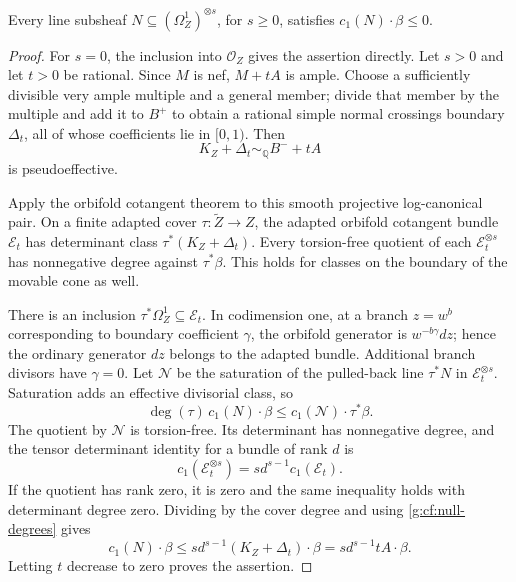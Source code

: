 \begin{lemma}\label{g:cf:cotangent-slope}
Every line subsheaf $N\subseteq(\Omega_Z^1)^{\otimes s}$, for
$s\geq0$, satisfies $c_1(N)\cdot\beta\leq0$.
\end{lemma}

\begin{proof}
For $s=0$, the inclusion into $\mathcal O_Z$ gives the
assertion directly.  Let $s>0$ and let $t>0$ be rational.
Since $M$ is nef, $M+tA$ is ample.  Choose a sufficiently
divisible very ample multiple and a general member; divide
that member by the multiple and add it to $B^+$ to obtain a
rational simple normal crossings boundary $\Delta_t$, all
of whose coefficients lie in $[0,1)$.  Then
\[
 K_Z+\Delta_t\sim_{\mathbb Q}B^-+tA
\]
is pseudoeffective.

Apply the orbifold cotangent theorem
\cite[Theorem~1.3 and Section~5]{CampanaPaun2019} to this smooth
projective log-canonical pair.  On a finite adapted cover
$\tau:\widetilde Z\to Z$, the adapted orbifold cotangent
bundle $\mathcal E_t$ has determinant class
$\tau^*(K_Z+\Delta_t)$.  Every torsion-free quotient of each
$\mathcal E_t^{\otimes s}$ has nonnegative degree against
$\tau^*\beta$.  This holds for classes on the boundary of
the movable cone as well.

There is an inclusion $\tau^*\Omega_Z^1\subseteq\mathcal E_t$.
In codimension one, at a branch $z=w^b$ corresponding to
boundary coefficient $\gamma$, the orbifold generator is
$w^{-b\gamma}dz$; hence the ordinary generator $dz$ belongs
to the adapted bundle.  Additional branch divisors have
$\gamma=0$.  Let $\mathcal N$ be the saturation of the
pulled-back line $\tau^*N$ in $\mathcal E_t^{\otimes s}$.
Saturation adds an effective divisorial class, so
\[
 \deg(\tau)\,c_1(N)\cdot\beta
   \leq c_1(\mathcal N)\cdot\tau^*\beta.
\]
The quotient by $\mathcal N$ is torsion-free.  Its determinant
has nonnegative degree, and the tensor determinant identity
for a bundle of rank $d$ is
\[
 c_1(\mathcal E_t^{\otimes s})
      =s d^{s-1}c_1(\mathcal E_t).
\]
If the quotient has rank zero, it is zero and the same
inequality holds with determinant degree zero.  Dividing
by the cover degree and using \eqref{g:cf:null-degrees}
gives
\begin{equation}\label{g:cf:tensor-bound}
 c_1(N)\cdot\beta
   \leq s d^{s-1}(K_Z+\Delta_t)\cdot\beta
   =s d^{s-1}tA\cdot\beta.
\end{equation}
Letting $t$ decrease to zero proves the assertion.
\end{proof}

